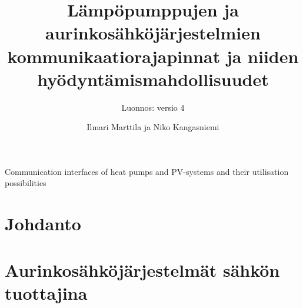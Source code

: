 \documentclass{tauthesis}
\begin{document}

\frontmatter


\title{Lämpöpumppujen ja aurinkosähköjärjestelmien kommunikaatiorajapinnat ja niiden hyödyntämismahdollisuudet}{Communication interfaces of heat pumps and PV-systems and their utilisation possibilities}
\subtitle{Luonnos: versio 4}

\author{Ilmari Marttila ja Niko Kangasniemi}






\keywords%
    {}

\maketitle




\tableofcontents

\listoffigures
\listoftables


\glossary

\mainmatter

\chapter{Johdanto}
\label{ch:johdanto}


\chapter{Aurinkosähköjärjestelmät sähkön tuottajina}
\label{ch:jarjestelmat_sahkon_tuottajina}

\end{document}
